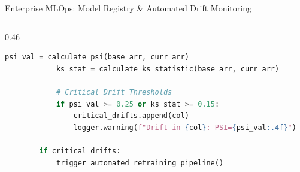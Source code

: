 \documentclass[10pt]{beamer}
\begin{document}
\begin{frame}[fragile]{Enterprise MLOps: Model Registry \& Automated Drift Monitoring}
\begin{columns}[T]
\begin{column}{0.46\textwidth}
\begin{lstlisting}[language=Python]
            psi_val = calculate_psi(base_arr, curr_arr)
            ks_stat = calculate_ks_statistic(base_arr, curr_arr)
            
            # Critical Drift Thresholds
            if psi_val >= 0.25 or ks_stat >= 0.15:
                critical_drifts.append(col)
                logger.warning(f"Drift in {col}: PSI={psi_val:.4f}")
                
        if critical_drifts:
            trigger_automated_retraining_pipeline()
\end{lstlisting}
    \end{column}
\end{columns}
\end{frame}

\end{document}
